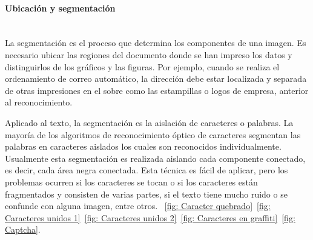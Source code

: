 \newpage
		\paragraph{Ubicación y segmentación}	 ~\\
		
		La segmentación es el proceso que determina los componentes de una imagen. Es necesario ubicar las regiones del documento donde se han impreso los datos y distinguirlos de los gráficos y las figuras. Por ejemplo, cuando se realiza el ordenamiento de correo automático, la dirección debe estar localizada y separada de otras impresiones en el sobre como las estampillas o logos de empresa, anterior al reconocimiento.
		
		Aplicado al texto, la segmentación es la aislación de caracteres o palabras. La mayoría de los algoritmos de reconocimiento óptico de caracteres segmentan las palabras en caracteres aislados los cuales son reconocidos individualmente. Usualmente esta segmentación es realizada aislando cada componente conectado, es decir, cada área negra conectada. Esta técnica es fácil de aplicar, pero los problemas ocurren si los caracteres se tocan o si los caracteres están fragmentados y consisten de varias partes, si el texto tiene mucho ruido o se confunde con alguna imagen, entre otros. ~\ref{fig: Caracter quebrado}~\ref{fig: Caracteres unidos 1}~\ref{fig: Caracteres unidos 2}~\ref{fig: Caracteres en graffiti}~\ref{fig: Captcha}.

